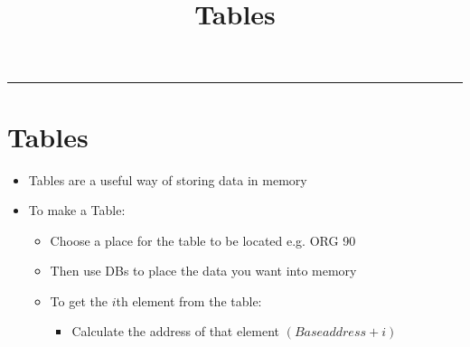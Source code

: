 \documentclass{article}
\title{Tables}
\begin{document}
\maketitle

\begin{center}
  \rule{0.5\textwidth}{0.4pt}
\end{center}

\section{Tables}
\begin{itemize}
  \item{Tables are a useful way of storing data in memory}
  \item{To make a Table:}
  \begin{itemize}
    \item{Choose a place for the table to be located e.g. ORG 90}
    \item{Then use DBs to place the data you want into memory}
    \item{To get the $i$th element from the table:}
    \begin{itemize}
      \item{Calculate the address of that element $(Base address + i)$}
    \end{itemize}
  \end{itemize}
\end{itemize}
\end{document}
